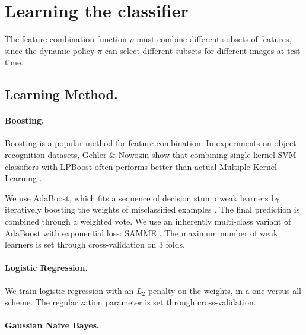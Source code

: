 \section{Learning the classifier}
The feature combination function $\rho$ must combine different subsets of features, since the dynamic policy $\pi$ can select different subsets for different images at test time.




\subsection{Learning Method.}
\paragraph{Boosting.}
Boosting is a popular method for feature combination.
In experiments on object recognition datasets, Gehler \& Nowozin show that combining single-kernel SVM classifiers with LPBoost often performs better than actual Multiple Kernel Learning \cite{Gehler2009}.

We use AdaBoost, which fits a sequence of decision stump weak learners by iteratively boosting the weights of misclassified examples \cite{Hastie2009}.
The final prediction is combined through a weighted vote.
We use an inherently multi-class variant of AdaBoost with exponential loss: SAMME \cite{Zhu2009}.
The maximum number of weak learners is set through cross-validation on 3 folds.

\paragraph{Logistic Regression.}
We train logistic regression with an $L_2$ penalty on the weights, in a one-versus-all scheme.
The regularization parameter is set through cross-validation.

\paragraph{Gaussian Naive Bayes.}

